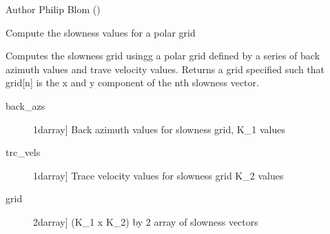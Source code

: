 \documentclass[letterpaper,10pt,english]{sphinxmanual}
\begin{document}
Author            Philip Blom ()

\begin{fulllineitems}
\label{\detokenize{infrapy.detection:infrapy.detection.beamforming_new.build_slowness}}
Compute the slowness values for a polar grid

Computes the slowness grid usingg a polar grid defined by a series of back azimuth
values and trave velocity values.  Returns a grid specified such that grid{[}n{]} is
the x and y component of the nth slowness vector.
\begin{description}
\item[{back\_azs}] \leavevmode{[}1darray{]}
Back azimuth values for slowness grid, K\_1 values

\item[{trc\_vels}] \leavevmode{[}1darray{]}
Trace velocity values for slowness grid K\_2 values

\end{description}
\begin{description}
\item[{grid}] \leavevmode{[}2darray{]}
(K\_1 x K\_2) by 2 array of slowness vectors

\end{description}

\end{fulllineitems}


\begin{fulllineitems}
\label{\detokenize{infrapy.detection:infrapy.detection.beamforming_new.calc_det_thresh}}
\end{fulllineitems}

\end{document}
